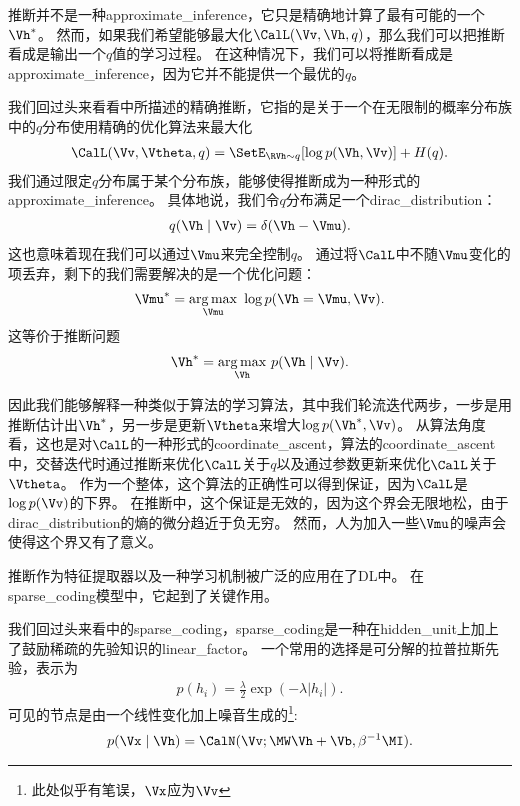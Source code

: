 推断并不是一种\gls{approximate_inference}，它只是精确地计算了最有可能的一个$\Vh^*$。
然而，如果我们希望能够最大化$\CalL(\Vv,\Vh,q)$，那么我们可以把推断看成是输出一个$q$值的学习过程。%
在这种情况下，我们可以将推断看成是\gls{approximate_inference}，因为它并不能提供一个最优的$q$。



我们回过头来看看中所描述的精确推断，它指的是关于一个在无限制的概率分布族中的$q$分布使用精确的优化算法来最大化
\begin{align}
\CalL(\Vv,{\Vtheta},q)
 = \SetE_{\RVh\sim q}[\log p(\Vh , \Vv)] + H(q).
\end{align}
我们通过限定$q$分布属于某个分布族，能够使得推断成为一种形式的\gls{approximate_inference}。
具体地说，我们令$q$分布满足一个\gls{dirac_distribution}：
\begin{align}
q(\Vh\mid\Vv) = \delta(\Vh - {\Vmu}).
\end{align}
这也意味着现在我们可以通过$\Vmu$来完全控制$q$。
通过将$\CalL$中不随$\Vmu$变化的项丢弃，剩下的我们需要解决的是一个优化问题：
\begin{align}
\Vmu^*  =  \underset{\Vmu}{\arg\max}\ \log p(\Vh = \Vmu,\Vv).
\end{align}
这等价于推断问题
\begin{align}
\Vh^* = \underset{\Vh}{\arg\max}\  p(\Vh\mid\Vv).
\end{align}




因此我们能够解释一种类似于算法的学习算法，其中我们轮流迭代两步，一步是用推断估计出$\Vh^*$，另一步是更新$\Vtheta$来增大$\log p(\Vh^*,\Vv)$。
从算法角度看，这也是对$\CalL$的一种形式的\gls{coordinate_ascent}，算法的\gls{coordinate_ascent}中，交替迭代时通过推断来优化$\CalL$关于$q$以及通过参数更新来优化$\CalL$关于$\Vtheta$。
作为一个整体，这个算法的正确性可以得到保证，因为$\CalL$是$\log p(\Vv)$的下界。
在推断中，这个保证是无效的，因为这个界会无限地松，由于\gls{dirac_distribution}的熵的微分趋近于负无穷。
然而，人为加入一些$\Vmu$的噪声会使得这个界又有了意义。



推断作为特征提取器以及一种学习机制被广泛的应用在了\gls{DL}中。
在\gls{sparse_coding}模型中，它起到了关键作用。


我们回过头来看中的\gls{sparse_coding}，\gls{sparse_coding}是一种在\gls{hidden_unit}上加上了鼓励稀疏的先验知识的\gls{linear_factor}。
一个常用的选择是可分解的拉普拉斯先验，表示为
\begin{align}
	p(h_i) = \frac{\lambda}{2}  \exp(-\lambda \vert h_i \vert).
\end{align}
可见的节点是由一个线性变化加上噪音生成的\footnote{此处似乎有笔误，$\Vx$应为$\Vv$}:
\begin{align}
p(\Vx\mid\Vh) = \CalN(\Vv;{\MW}\Vh + \Vb,\beta^{-1}{\MI}).
\end{align}




